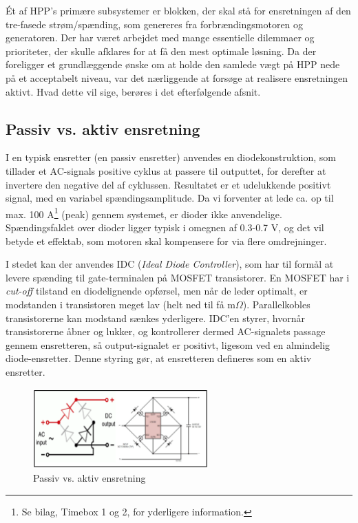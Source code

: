 Ét af HPP’s primære subsystemer er blokken, der skal stå for ensretningen af den tre-fasede strøm/spænding, som genereres fra forbrændingsmotoren og generatoren. Der har været arbejdet med  mange essentielle dilemmaer og prioriteter, der skulle afklares for at få den mest optimale løsning. Da der foreligger et grundlæggende ønske om at holde den samlede vægt på HPP nede på et acceptabelt niveau, var det nærliggende at forsøge at realisere ensretningen aktivt. Hvad dette vil sige, berøres i det efterfølgende afsnit.

\subsection{Passiv vs. aktiv ensretning}
\label{sec:passiv-vs.-aktiv}

I en typisk ensretter (en passiv ensretter) anvendes en diodekonstruktion, som tillader et AC-signals positive cyklus at passere til outputtet, for derefter at invertere den negative del af cyklussen. Resultatet er et udelukkende positivt signal, med en variabel spændingsamplitude. Da vi forventer at lede ca. op til max. 100 A\footnote{Se bilag, Timebox 1 og 2, for yderligere information.} (peak) gennem systemet, er dioder ikke anvendelige. Spændingsfaldet over dioder ligger typisk i omegnen af 0.3-0.7 V, og det vil betyde et effektab, som motoren skal kompensere for via flere omdrejninger.

I stedet kan der anvendes IDC (\textit{Ideal Diode Controller}), som har til formål at levere spænding til gate-terminalen på MOSFET transistorer. En MOSFET har i \textit{cut-off} tilstand en diodelignende opførsel, men når de leder optimalt, er modstanden i transistoren meget lav (helt ned til få m$\Omega$). Parallelkobles transistorerne kan modstand sænkes yderligere. IDC’en styrer, hvornår transistorerne åbner og lukker, og kontrollerer dermed AC-signalets passage gennem ensretteren, så output-signalet er positivt, ligesom ved en almindelig diode-ensretter. Denne styring gør, at ensretteren defineres som en aktiv ensretter.
\clearpage
\begin{figure}[h]
  \centering
  \includegraphics[width=0.6\textwidth]{./figurer/prens1.png}
  \caption{Passiv vs. aktiv ensretning}
  \label{fig:prens1}
\end{figure}

